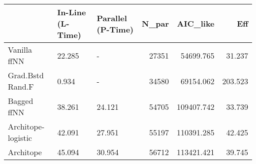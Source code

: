 \begin{tabular}{lllrrr}
\toprule
{} & In-Line (L-Time) & Parallel (P-Time) &  N\_par &    AIC\_like &      Eff \\
\midrule
Vanilla ffNN       &           22.285 &                 - &  27351 &   54699.765 &   31.237 \\
Grad.Bstd Rand.F   &            0.934 &                 - &  34580 &   69154.062 &  203.523 \\
Bagged ffNN        &           38.261 &            24.121 &  54705 &  109407.742 &   33.739 \\
Architope-logistic &           42.091 &            27.951 &  55197 &  110391.285 &   42.425 \\
Architope          &           45.094 &            30.954 &  56712 &  113421.421 &   39.745 \\
\bottomrule
\end{tabular}
